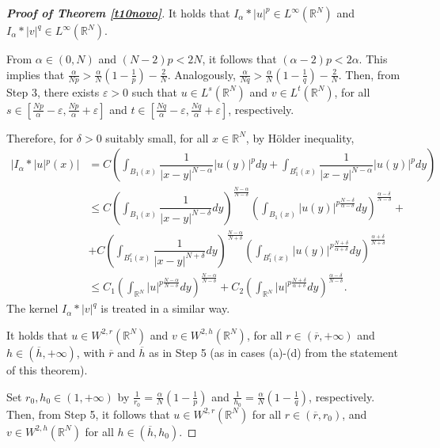\documentclass[12pt,a4paper]{article}
\numberwithin{equation}{section}
\begin{document}
\begin{proof}[\bf{Proof of Theorem \ref{t10novo}}]
\medbreak
{} It holds that $I_\alpha \ast |u|^p \in L^{\infty}(\mathbb{R}^N)$ and $I_\alpha \ast |v|^q \in L^{\infty}(\mathbb{R}^N)$. 

From $\alpha\in (0, N)$ and $(N-2)p< 2N$, it follows that $(\alpha-2)p<2\alpha$. This implies that $\frac{\alpha}{Np}>\frac{\alpha}{N}\left(1-\frac{1}{p}\right)-\frac{2}{N}$. Analogously, $\frac{\alpha}{Nq}>\frac{\alpha}{N}\left(1-\frac{1}{q}\right)-\frac{2}{N}$. Then, from Step 3, there exists $\varepsilon > 0$ such that $u\in L^{s}(\mathbb{R}^N)$ and $v\in L^{t}(\mathbb{R}^N)$, for all $s\in \left[\frac{Np}{\alpha}-\varepsilon, \frac{Np}{\alpha}+\varepsilon\right]$ and $t\in \left[\frac{Nq}{\alpha}-\varepsilon, \frac{Nq}{\alpha}+\varepsilon\right]$, respectively. 

Therefore, for $\delta >0$ suitably small, for all $x \in \mathbb{R}^N$, by Hölder inequality,
\begin{align*}
 |I_\alpha \ast |u|^p(x)| & = C\left( \int_{B_1(x)} \dfrac{1}{|x-y|^{N-\alpha}}|u(y)|^p dy + \int_{B_{1}^{c}(x)} \dfrac{1}{|x-y|^{N-\alpha}}|u(y)|^p dy\right)\\
 & \leq C\left(\int_{B_1(x)} \dfrac{1}{|x-y|^{N-\delta}} dy\right)^{\frac{N-\alpha}{N-\delta}}\left(\int_{B_1(x)} |u(y)|^{p\frac{N-\delta}{\alpha - \delta}} dy\right)^{\frac{\alpha-\delta}{N-\delta}}+ \\
 & + C\left(\int_{B_{1}^{c}(x)} \dfrac{1}{|x-y|^{N+\delta}} dy\right)^{\frac{N-\alpha}{N+\delta}}\left(\int_{B_{1}^{c}(x)} |u(y)|^{p\frac{N+\delta}{\alpha +\delta}} dy\right)^{\frac{\alpha+\delta}{N+\delta}}\\
 & \leq C_1 \left(\int_{\mathbb{R}^N} |u|^{p\frac{N-\alpha}{N-\delta}}dy \right)^{\frac{N-\alpha}{N-\delta}}+C_2 \left(\int_{\mathbb{R}^N} |u|^{p\frac{N+\delta}{\alpha +\delta}}dy\right)^{\frac{\alpha-\delta}{N-\delta}}.
\end{align*}
The kernel $I_\alpha \ast |v|^q $ is treated in a similar way.

\medbreak
{} It holds that $u\in W^{2, r}(\mathbb{R}^N)$ and $v\in W^{2, h}(\mathbb{R}^N)$, for all $r \in (\overline{r}, +\infty)$ and $h\in (\overline{h}, +\infty)$, with $\overline{r}$ and $\overline{h}$ as in Step 5 (as in cases (a)-(d) from the statement of this theorem).

Set $r_0, h_0\in (1, +\infty)$ by $\frac{1}{r_0}=\frac{\alpha}{N}\left(1-\frac{1}{p}\right)$ and $\frac{1}{h_0}=\frac{\alpha}{N}\left(1-\frac{1}{q}\right)$, respectively. Then, from Step 5, it follows that $u\in W^{2, r}(\mathbb{R}^N)$ for all $r\in (\overline{r}, r_0)$, and $v\in W^{2, h}(\mathbb{R}^N)$ for all $h\in (\overline{h}, h_0)$. 


\end{proof}
\end{document}
